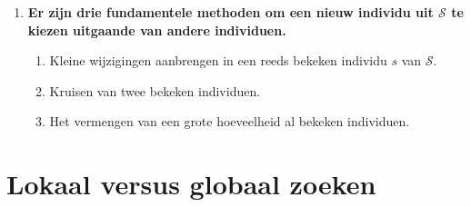 \begin{itemize}
\begin{enumerate}
        \item \textbf{Er zijn drie fundamentele methoden om een nieuw individu uit $\mathcal{S}$ te kiezen uitgaande van andere individuen.}
        \begin{enumerate}
            \item Kleine wijzigingen aanbrengen in een reeds bekeken individu $s$ van $\mathcal{S}$.
            \item Kruisen van twee bekeken individuen. 
            \item Het vermengen van een grote hoeveelheid al bekeken individuen.
        \end{enumerate}
    \end{enumerate}
\end{itemize}


\section{Lokaal versus globaal zoeken}
